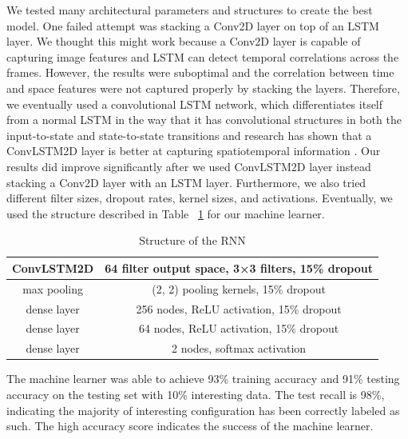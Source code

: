 \documentclass[12pt]{article}
\numberwithin{figure}{section} %
\begin{document}
We tested many architectural parameters and structures to create the best model. One failed attempt was stacking a Conv2D layer on top of an LSTM layer. We thought this might work because a Conv2D layer is capable of capturing image features and LSTM can detect temporal correlations across the frames. However, the results were suboptimal and the correlation between time and space features were not captured properly by stacking the layers. Therefore, we eventually used a convolutional LSTM network, which differentiates itself from a normal LSTM in the way that it has convolutional structures in both the input-to-state and state-to-state transitions and research has shown that a ConvLSTM2D layer is better at capturing spatiotemporal information \cite{ConvLSTM}. Our results did improve significantly after we used ConvLSTM2D layer instead stacking a Conv2D layer with an LSTM layer. Furthermore, we also tried different filter sizes, dropout rates, kernel sizes, and activations. Eventually, we used the structure described in Table ~\ref{table:RNN structure} for our machine learner. 
\begin{table}[H]
\begin{center}
\begin{tabular}{ | c | c | } 
\hline
ConvLSTM2D & 64 filter output space, 3×3 filters, 15\% dropout \\ 
\hline
max pooling & (2, 2) pooling kernels, 15\% dropout  \\ 
\hline
dense layer & 256 nodes, ReLU activation, 15\% dropout  \\ 
\hline
dense layer & 64 nodes, ReLU activation, 15\% dropout  \\ 
\hline
dense layer & 2 nodes, softmax activation \\
\hline
\end{tabular}
\caption{Structure of the RNN}
\label{table:RNN structure}
\vspace{-2.5em}
\end{center}
\end{table}

The machine learner was able to achieve 93\% training accuracy and 91\% testing accuracy on the testing set with 10\% interesting data. The test recall is 98\%, indicating the majority of interesting configuration has been correctly labeled as such. The high accuracy score indicates the success of the machine learner. 
\end{document}
